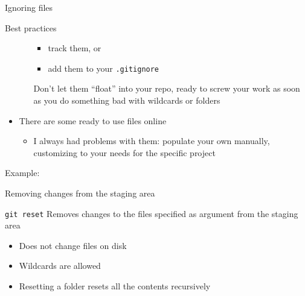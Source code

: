 \documentclass[presentation]{beamer}
\begin{document}
\begin{frame}[allowframebreaks]{Ignoring files}
\begin{block}{Best practices}
\begin{itemize}
\begin{enumerate}
\begin{itemize}
                    \item track them, or
                    \item add them to your \texttt{.gitignore}
                \end{itemize}
                Don't let them ``float'' into your repo, ready to screw your work as soon as you do something bad with wildcards or folders
            \end{enumerate}
            \item There are some ready to use files online
            \begin{itemize}
                \item I always had problems with them: populate your own manually, customizing to your needs for the specific project
            \end{itemize}
        \end{itemize}
    \end{block}
    Example:
\end{frame}

\begin{frame}{Removing changes from the staging area}
    \begin{block}{\texttt{git reset}}
        Removes changes to the files specified as argument from the staging area
        \begin{itemize}
            \item Does not change files on disk
            \item Wildcards are allowed 
            \item Resetting a folder resets all the contents recursively
        \end{itemize}
    \end{block}
\end{frame}
\end{document}
